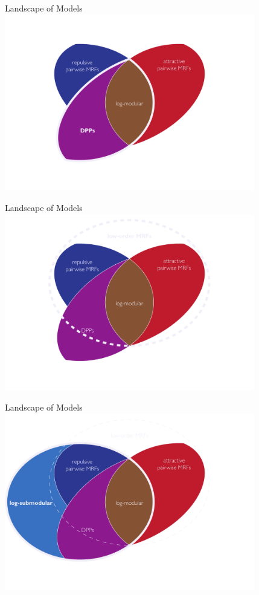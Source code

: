 \documentclass[mathserif]{beamer}
\begin{document}
\begin{frame}{Landscape of Models}
\centering
\includegraphics[width=4.3in]{figures/venn04.pdf}
\end{frame}

\begin{frame}{Landscape of Models}
\centering
\includegraphics[width=4.3in]{figures/venn05.pdf}
\end{frame}

\begin{frame}{Landscape of Models}
\centering
\includegraphics[width=4.3in]{figures/venn06.pdf}
\end{frame}
\end{document}
